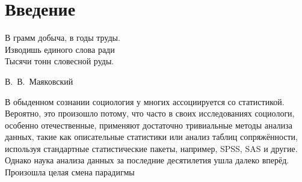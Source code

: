 \chapter*{Введение}							%
\epigraph{В грамм добыча, в годы труды.\\
Изводишь единого слова ради\\
Тысячи тонн словесной руды.}{В.~В.~Маяковский}

В обыденном сознании социология у многих ассоциируется со статистикой. Вероятно, это произошло потому, что часто в своих исследованиях социологи, особенно отечественные, применяют достаточно тривиальные методы анализа данных, такие как описательные статистики или анализ таблиц сопряжённости, используя стандартные статистические пакеты, например, SPSS, SAS и другие. Однако наука анализа данных за последние десятилетия ушла далеко вперёд. Произошла целая смена парадигмы\cite{Davydov_Knowledge}


\clearpage